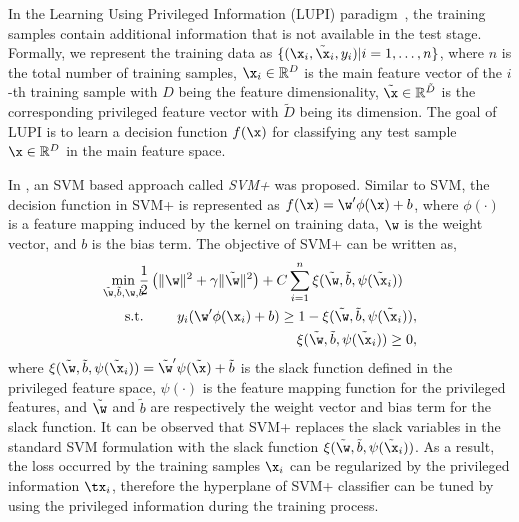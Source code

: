 In the Learning Using Privileged Information (LUPI)
paradigm~\citep{SVMplus_vapnik}, the training samples contain
additional information that is not available in the test
stage. Formally, we represent the training data as $\{(\x_i,
\tilde{\x}_i, y_i)|i = 1, \ldots, n\}$, where $n$ is the total number
of training samples, $\x_i \in \bbR^D$ is the main feature vector of
the $i$-th training sample with $D$ being the feature dimensionality,
$\tilde{\x} \in \bbR^{\tilde{D}}$ is the corresponding privileged
feature vector with $\tilde{D}$ being its dimension. The goal of LUPI
is to learn a decision function $f(\x)$ for classifying any test
sample $\x \in \bbR^D$ in the main feature space.

In \citep{SVMplus_vapnik}, an SVM based approach called \emph{SVM+} was proposed. Similar to SVM, the decision function in SVM+ is represented as $f(\x) = \w'\phi(\x) + b$, where $\phi(\cdot)$ is a feature mapping induced by the kernel on training data, $\w$ is the weight vector, and $b$ is the bias term. The objective of SVM+ can be written as,
\begin{eqnarray}
\min_{\tilde{\w}, \tilde{b}, \w, b}\!\!\!\!&&\!\!\!\!\frac{1}{2}\left(\|\w\|^2 + \gamma\|\tilde{\w}\|^2\right)+ C\sum_{i=1}^{n}\xi(\tilde{\w}, \tilde{b}, \psi(\tilde{\x}_i))\quad\label{eqn:PL}\\
\mbox{s.t.}\!\!\!\!&&\!\!\!\!y_i(\w'\phi(\x_i) + b) \geq 1 - \xi(\tilde{\w}, \tilde{b}, \psi(\tilde{\x}_i)),\label{eqn:PL_cons1}\\
\!\!\!\!&&\!\!\!\!\xi(\tilde{\w}, \tilde{b}, \psi(\tilde{\x}_i)) \geq 0,\label{eqn:PL_cons2}
\end{eqnarray}
where $\xi(\tilde{\w}, \tilde{b}, \psi(\tilde{\x}_i)) = \tilde{\w}'\psi(\tilde{\x})+\tilde{b}$ is the slack function defined in the privileged feature space, $\psi(\cdot)$ is the feature mapping function for the privileged features, and $\tilde{\w}$ and $\tilde{b}$ are respectively the weight vector and bias term for the slack function. It can be observed that SVM+ replaces the slack variables in the standard SVM formulation with the slack function $\xi(\tilde{\w}, \tilde{b}, \psi(\tilde{\x}_i))$. As a result, the loss occurred by the training samples $\x_i$ can be regularized by the privileged information $\tx_i$, therefore the hyperplane of SVM+ classifier can be tuned by using the privileged information during the training process.

